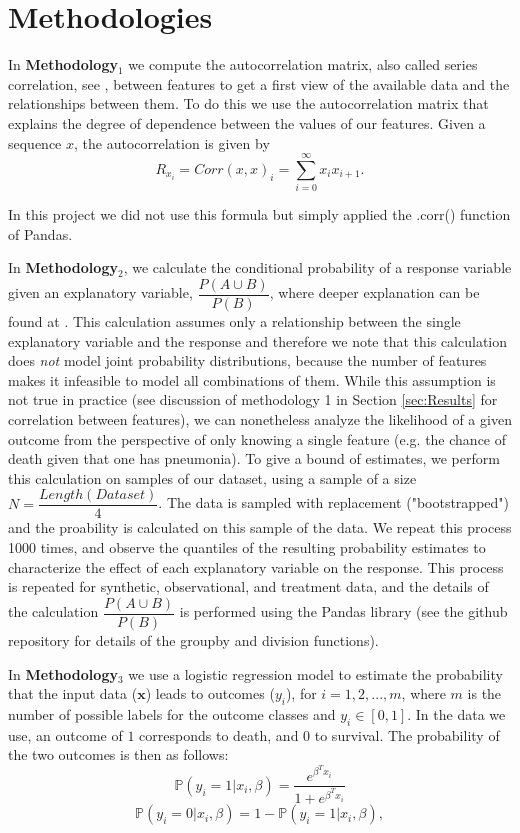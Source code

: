 \section{Methodologies}
\label{sec:methodologies}

In \textbf{Methodology$_1$} we compute the autocorrelation matrix, also called series correlation, see \cite{Devore-Berk}, between features to get a first view of the available data and the relationships between them.  To do this we use the autocorrelation matrix that explains the degree of dependence between the values of our features. 
Given a sequence $x$, the autocorrelation is given by $$R_x_i=Corr(x,x)_i=\sum_{i=0}^{\infty}x_i x_{i+1}.$$

In this project we did not use this formula but simply applied the .corr() function of Pandas.
\bigskip

In \textbf{Methodology$_2$}, we calculate the conditional probability of a response variable given an explanatory variable, $\dfrac{P(A\cup B)}{P(B)}$, where deeper explanation can be found at \cite{Walsh-John-B}. This calculation assumes only a relationship between the single explanatory variable and the response and therefore we note that this calculation does \emph{not} model joint probability distributions, because the number of features makes it infeasible to model all combinations of them. While this assumption is not true in practice (see discussion of methodology 1 in Section \ref{sec:Results} for correlation between features), we can nonetheless analyze the likelihood of a given outcome from the perspective of only knowing a single feature (e.g. the chance of death given that one has pneumonia). To give a bound of estimates, we perform this calculation on samples of our dataset, using a sample of a size $N = \dfrac{Length(Dataset)}{4}$. The data is sampled with replacement ("bootstrapped") and the proability is calculated on this sample of the data. We repeat this process 1000 times, and observe the quantiles of the resulting probability estimates to characterize the effect of each explanatory variable on the response. This process is repeated for synthetic, observational, and treatment data, and the details of the calculation $\dfrac{P(A\cup B)}{P(B)}$ is performed using the Pandas library (see the github repository for details of the groupby and division functions).


\bigskip
In \textbf{Methodology$_3$} we use a logistic regression model to estimate the probability that the input data ($\textbf{x}$) leads to outcomes ($y_i$), for $i=1, 2, ..., m$, where $m$ is the number of possible labels for the outcome classes and $y_i \in [0, 1]$. In the data we use, an outcome of $1$ corresponds to death, and $0$ to survival. The probability of the two outcomes is then as follows: $$\mathbb{P}(y_i=1|x_i, \beta) = \frac{e^{\beta^T x_i}}{1+e^{\beta^T x_i}}$$
$$\mathbb{P}(y_i=0|x_i, \beta) = 1 - \mathbb{P}(y_i = 1|x_i, \beta),$$

